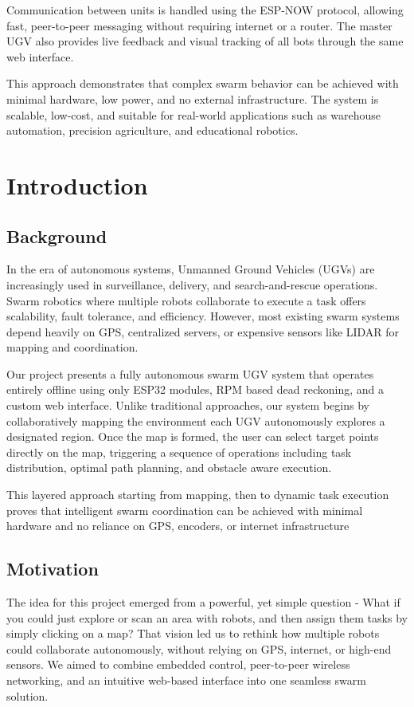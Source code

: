 \documentclass[a4paper,12pt]{report}
\begin{document}
Communication between units is handled using the ESP-NOW protocol, allowing fast,
peer-to-peer messaging without requiring internet or a router. The master UGV also
provides live feedback and visual tracking of all bots through the same web interface.

This approach demonstrates that complex swarm behavior can be achieved with
minimal hardware, low power, and no external infrastructure. The system is scalable,
low-cost, and suitable for real-world applications such as warehouse automation,
precision agriculture, and educational robotics.

\newpage
\chapter{Introduction}

\section{Background}
 In the era of autonomous systems, Unmanned Ground Vehicles (UGVs) are increasingly
 used in surveillance, delivery, and search-and-rescue operations. Swarm robotics where
 multiple robots collaborate to execute a task offers scalability, fault tolerance, and
 efficiency. However, most existing swarm systems depend heavily on GPS, centralized
 servers, or expensive sensors like LIDAR for mapping and coordination.

 
 Our project presents a fully autonomous swarm UGV system that operates entirely offline
 using only ESP32 modules, RPM based dead reckoning, and a custom web interface.
 Unlike traditional approaches, our system begins by collaboratively mapping the
 environment each UGV autonomously explores a designated region. Once the map is
 formed, the user can select target points directly on the map, triggering a sequence of
 operations including task distribution, optimal path planning, and obstacle aware
 execution.

 
 This layered approach starting from mapping, then to dynamic task execution proves
 that intelligent swarm coordination can be achieved with minimal hardware and no
 reliance on GPS, encoders, or internet infrastructure
 \newpage
\section{Motivation}
The idea for this project emerged from a powerful, yet simple question - What if you could just explore or scan an area with robots, and then assign them tasks by simply clicking on a map? That vision led us to rethink how multiple robots could collaborate autonomously, without relying on GPS, internet, or high-end sensors. We aimed to combine embedded control, peer-to-peer wireless networking, and an intuitive web-based interface into one seamless swarm solution.
\end{document}

